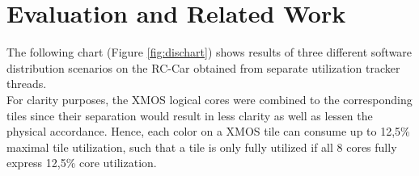 \documentclass [a4paper,final,conference,10pt]{IDAACS}
\begin{document}

\section{Evaluation and Related Work}
\label{sec:eval}
The following chart (Figure \ref{fig:dischart}) shows results of three different software distribution scenarios on the RC-Car obtained from separate utilization tracker threads. \\
For clarity purposes, the XMOS logical cores were combined to the corresponding tiles since their separation would result in less clarity as well as lessen the physical accordance. Hence, each color on a XMOS tile can consume up to 12,5\% maximal tile utilization, such that a tile is only fully utilized if all 8 cores fully express 12,5\% core utilization.
\end{document}

